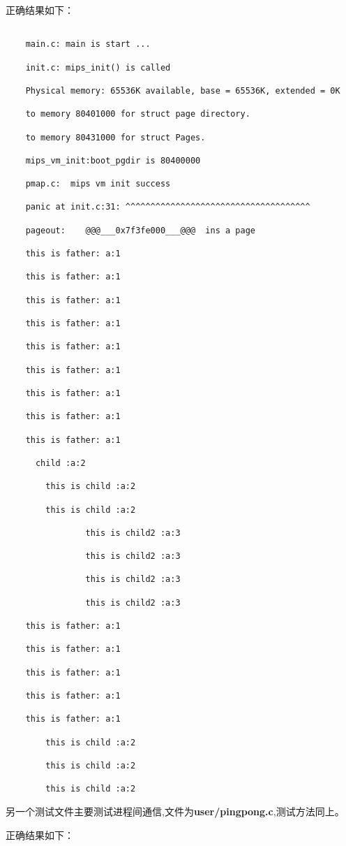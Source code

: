 正确结果如下：

\begin{verbatim}

	main.c:	main is start ...

	init.c:	mips_init() is called

	Physical memory: 65536K available, base = 65536K, extended = 0K

	to memory 80401000 for struct page directory.

	to memory 80431000 for struct Pages.

	mips_vm_init:boot_pgdir is 80400000

	pmap.c:	 mips vm init success

	panic at init.c:31: ^^^^^^^^^^^^^^^^^^^^^^^^^^^^^^^^^^^^^

	pageout:	@@@___0x7f3fe000___@@@  ins a page

	this is father: a:1

	this is father: a:1

	this is father: a:1

	this is father: a:1

	this is father: a:1

	this is father: a:1

	this is father: a:1

	this is father: a:1

	this is father: a:1

	  child :a:2

		this is child :a:2

		this is child :a:2

				this is child2 :a:3

				this is child2 :a:3

				this is child2 :a:3

				this is child2 :a:3

	this is father: a:1

	this is father: a:1

	this is father: a:1

	this is father: a:1

	this is father: a:1

		this is child :a:2

		this is child :a:2

		this is child :a:2
\end{verbatim}

另一个测试文件主要测试进程间通信,文件为\textbf{user/pingpong.c},测试方法同上。

正确结果如下：


